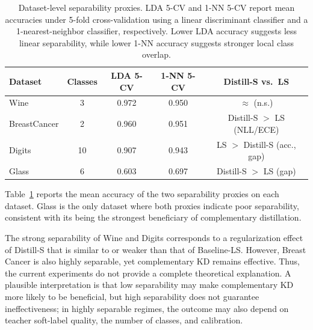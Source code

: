 \documentclass[a4paper,fleqn]{cas-dc}
\begin{document}
\begin{table}[t]
\centering
\caption{Dataset-level separability proxies. LDA 5-CV and 1-NN 5-CV report
         mean accuracies under 5-fold cross-validation using a linear
         discriminant classifier and a 1-nearest-neighbor classifier,
         respectively. Lower LDA accuracy suggests less linear separability,
         while lower 1-NN accuracy suggests stronger local class overlap.}
\label{tab:separability}
\setlength{\tabcolsep}{7pt}
\begin{tabular}{lcccc}
\toprule
Dataset & Classes & LDA 5-CV & 1-NN 5-CV & Distill-S vs.\ LS \\
\midrule
Wine         & 3 & 0.972 & 0.950 & $\approx$ (n.s.) \\
BreastCancer & 2 & 0.960 & 0.951 & Distill-S $>$ LS (NLL/ECE) \\
Digits       & 10 & 0.907 & 0.943 & LS $>$ Distill-S (acc., gap) \\
Glass        & 6 & 0.603 & 0.697 & Distill-S $>$ LS (gap) \\
\bottomrule
\end{tabular}
\end{table}

Table~\ref{tab:separability} reports the mean accuracy of the two separability proxies on each dataset.
Glass is the only dataset where both proxies indicate poor separability,
consistent with its being the strongest beneficiary of complementary
distillation.

The strong separability of Wine and Digits corresponds to a regularization effect of Distill-S that is similar to or weaker than that of Baseline-LS. However, Breast Cancer is also highly separable, yet complementary KD remains effective. Thus, the current experiments do not provide a complete theoretical explanation. A plausible interpretation is that low separability may make complementary KD more likely to be beneficial, but high separability does not guarantee ineffectiveness; in highly separable regimes, the outcome may also depend on teacher soft-label quality, the number of classes, and calibration.
\end{document}
